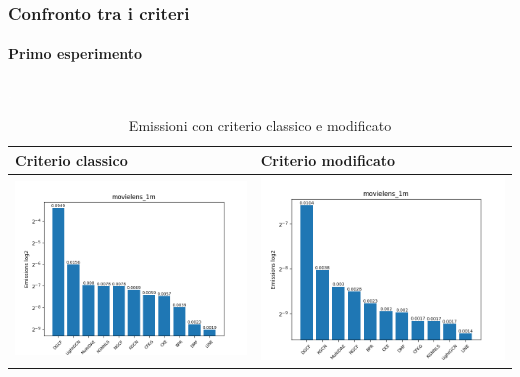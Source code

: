 \subsubsection{Confronto tra i criteri}

\paragraph{Primo esperimento} \textcolor{white}{.} \\
\begin{table}[H]
    \centering
    \footnotesize
    \setlength\tabcolsep{0pt}
    \begin{tabularx}{\textwidth}{|X|X|}
        \hline
        \textbf{Criterio classico} & \textbf{Criterio modificato} \\
        \hline
        \includegraphics[width=\linewidth, trim=0 0 0 0]{images/emissions_movielens_1m_40_5_earlyClassic.png} &
        \includegraphics[width=\linewidth, trim=0 0 0 0]{images/emissions_movielens_1m_40_5_earlyModified.png} \\
        \hline
    \end{tabularx}
    \caption{Emissioni con criterio classico e modificato}
    \label{tab:emissions_info}
\end{table}




